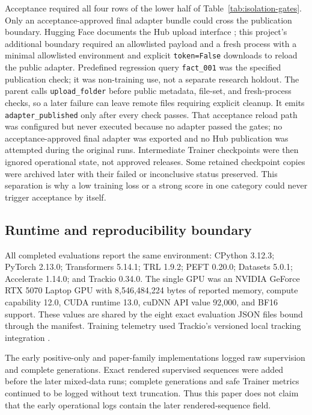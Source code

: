 Acceptance required all four rows of the lower half of
Table~\ref{tab:isolation-gates}.  Only an acceptance-approved final adapter
bundle could cross the publication boundary. Hugging Face documents the Hub
upload interface \citep{huggingfacehub}; this project's additional boundary
required an allowlisted payload and a fresh process with a minimal allowlisted
environment and explicit \texttt{token=False} downloads to reload the public
adapter. Predefined regression query \texttt{fact\_001} was the specified
publication check; it was non-training use, not a separate research holdout.
The parent calls \texttt{upload\_folder} before public metadata, file-set, and
fresh-process checks, so a later failure can leave remote files requiring
explicit cleanup. It emits \texttt{adapter\_published} only after every check
passes. That acceptance reload path was configured but never executed because
no adapter passed the gates; no acceptance-approved final adapter was exported
and no Hub publication was attempted during the original runs. Intermediate
Trainer checkpoints were then ignored operational state, not approved releases.
Some retained checkpoint copies were archived later with their failed or
inconclusive status preserved. This separation is why a low training loss or a
strong score in one category could never trigger acceptance by itself.
%
%
%

\subsection{Runtime and reproducibility boundary}
\label{sec:runtime}

All completed evaluations report the same environment: CPython 3.12.3;
PyTorch 2.13.0; Transformers 5.14.1; TRL 1.9.2; PEFT 0.20.0; Datasets 5.0.1;
Accelerate 1.14.0; and Trackio 0.34.0.  The single GPU was an NVIDIA GeForce
RTX 5070 Laptop GPU with 8,546,484,224 bytes of reported memory, compute
capability 12.0, CUDA runtime 13.0, cuDNN API value 92,000, and BF16 support.
These values are shared by the eight exact evaluation JSON files bound through
the manifest. Training telemetry used Trackio's versioned local tracking
integration \citep{trackio}. %

The early positive-only and paper-family implementations logged raw
supervision and complete generations. Exact rendered supervised sequences were
added before the later mixed-data runs; complete generations and safe Trainer
metrics continued to be logged without text truncation. Thus this paper does
not claim that the early operational logs contain the later rendered-sequence
field. %


